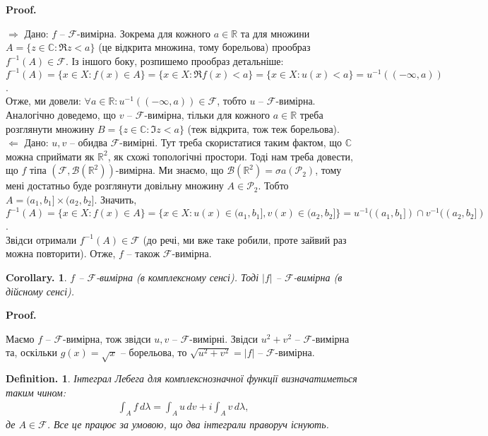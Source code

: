 \documentclass[a4paper, 10pt]{article}
\makeatletter
\def\rightproof{$\boxed{\Rightarrow}$ }
\def\leftproof{$\boxed{\Leftarrow}$ }
\theoremstyle{theoremdd}
\newtheorem*{definition*}{Definition.}
\newtheorem*{corollary*}{Corollary.}
\renewenvironment{proof}[1][Proof.\\]{\par
\pushQED{\hfill \qed}%
\normalfont \topsep6\p@\@plus6\p@\relax
\trivlist
\item\relax
{\bfseries
#1\@addpunct{.}}\hspace\labelsep\ignorespaces
}{%
\popQED\endtrivlist\@endpefalse
}
\makeatother
\begin{document}
\begin{proof}
\rightproof Дано: $f$ -- $\mathcal{F}$-вимірна. Зокрема для кожного $a \in \mathbb{R}$ та для множини $A = \{z \in \mathbb{C}: \Re z < a\}$ (це відкрита множина, тому борельова) прообраз $f^{-1}(A) \in \mathcal{F}$. Із іншого боку, розпишемо прообраз детальніше:\\
$f^{-1}(A) = \{x \in X: f(x) \in A\} = \{x \in X: \Re f(x) < a\} = \{x \in X: u(x) < a\} = u^{-1}((-\infty,a))$.\\
Отже, ми довели: $\forall a \in \mathbb{R}: u^{-1}((-\infty,a)) \in \mathcal{F}$, тобто $u$ -- $\mathcal{F}$-вимірна.\\
Аналогічно доведемо, що $v$ -- $\mathcal{F}$-вимірна, тільки для кожного $a \in \mathbb{R}$ треба розглянути множину $B = \{z \in \mathbb{C}: \Im z < a\}$ (теж відкрита, тож теж борельова).
\bigskip \\
\leftproof Дано: $u,v$ -- обидва $\mathcal{F}$-вимірні. Тут треба скористатися таким фактом, що $\mathbb{C}$ можна сприймати як $\mathbb{R}^2$, як схожі топологічні простори. Тоді нам треба довести, що $f$ тіпа $(\mathcal{F},\mathcal{B}(\mathbb{R}^2))$-вимірна. Ми знаємо, що $\mathcal{B}(\mathbb{R}^2) = \sigma a(\mathcal{P}_2)$, тому мені достатньо буде розглянути довільну множину $A \in \mathcal{P}_2$. Тобто $A = (a_1,b_1] \times (a_2,b_2]$. Значить,\\
$f^{-1}(A) = \{ x \in X: f(x) \in A \} = \{x \in X: u(x) \in (a_1,b_1], v(x) \in (a_2,b_2]\} = u^{-1}((a_1,b_1]) \cap v^{-1}((a_2,b_2])$.\\
Звідси отримали $f^{-1}(A) \in \mathcal{F}$ (до речі, ми вже таке робили, проте зайвий раз можна повторити). Отже, $f$ -- також $\mathcal{F}$-вимірна.
\end{proof}

\begin{corollary*}
$f$ -- $\mathcal{F}$-вимірна (в комплексному сенсі). Тоді $|f|$ -- $\mathcal{F}$-вимірна (в дійсному сенсі).
\end{corollary*}

\begin{proof}
Маємо $f$ -- $\mathcal{F}$-вимірна, тож звідси $u,v$ -- $\mathcal{F}$-вимірні. Звідси $u^2 + v^2$ -- $\mathcal{F}$-вимірна та, оскільки $g(x) = \sqrt{x}$ -- борельова, то $\sqrt{u^2 + v^2} = |f|$ -- $\mathcal{F}$-вимірна.
\end{proof}

\begin{definition*}
Інтеграл Лебега для комплекснозначної функції визначатиметься таким чином:
\begin{align*}
\int_A f\,d\lambda = \int_A u\,dv + i \int_A v\,d\lambda,
\end{align*}
де $A \in \mathcal{F}$. Все це працює за умовою, що два інтеграли праворуч існують.
\end{definition*}
\end{document}
